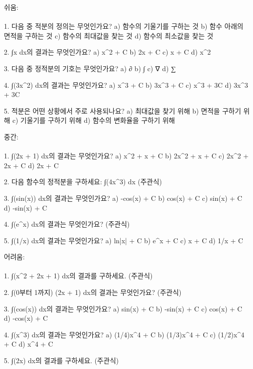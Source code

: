 \documentclass[fleqn]{article}
\begin{document}
      
        쉬움: \\\\  
1. 다음 중 적분의 정의는 무엇인가요?  
   a) 함수의 기울기를 구하는 것  
   b) 함수 아래의 면적을 구하는 것  
   c) 함수의 최대값을 찾는 것  
   d) 함수의 최소값을 찾는 것  

2. ∫x dx의 결과는 무엇인가요?  
   a) x^2 + C  
   b) 2x + C  
   c) x + C  
   d) x^2  

3. 다음 중 정적분의 기호는 무엇인가요?  
   a) ∂  
   b) ∫  
   c) ∇  
   d) ∑  

4. ∫(3x^2) dx의 결과는 무엇인가요?  
   a) x^3 + C  
   b) 3x^3 + C  
   c) x^3 + 3C  
   d) 3x^3 + 3C  

5. 적분은 어떤 상황에서 주로 사용되나요?  
   a) 최대값을 찾기 위해  
   b) 면적을 구하기 위해  
   c) 기울기를 구하기 위해  
   d) 함수의 변화율을 구하기 위해  

중간: \\\\  
1. ∫(2x + 1) dx의 결과는 무엇인가요?  
   a) x^2 + x + C  
   b) 2x^2 + x + C  
   c) 2x^2 + 2x + C  
   d) 2x + C  

2. 다음 함수의 정적분을 구하세요: ∫(4x^3) dx  
   (주관식)  

3. ∫(sin(x)) dx의 결과는 무엇인가요?  
   a) -cos(x) + C  
   b) cos(x) + C  
   c) sin(x) + C  
   d) -sin(x) + C  

4. ∫(e^x) dx의 결과는 무엇인가요?  
   (주관식)  

5. ∫(1/x) dx의 결과는 무엇인가요?  
   a) ln|x| + C  
   b) e^x + C  
   c) x + C  
   d) 1/x + C  

어려움: \\\\  
1. ∫(x^2 + 2x + 1) dx의 결과를 구하세요.  
   (주관식)  

2. ∫(0부터 1까지) (2x + 1) dx의 결과는 무엇인가요?  
   (주관식)  

3. ∫(cos(x)) dx의 결과는 무엇인가요?  
   a) sin(x) + C  
   b) -sin(x) + C  
   c) cos(x) + C  
   d) -cos(x) + C  

4. ∫(x^3) dx의 결과는 무엇인가요?  
   a) (1/4)x^4 + C  
   b) (1/3)x^4 + C  
   c) (1/2)x^4 + C  
   d) x^4 + C  

5. ∫(2x) dx의 결과를 구하세요.  
   (주관식)  

      
        
\end{document}
